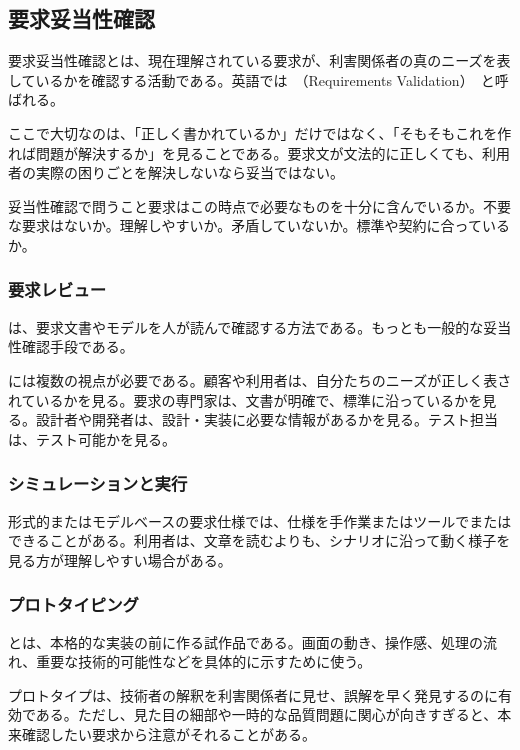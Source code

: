 \documentclass[a4paper,11pt]{ltjsarticle}
\numberwithin{figure}{section}
\numberwithin{table}{section}
\newcommand{\en}[1]{（#1）}
\newcommand{\MiniBox}[2]{\par\smallskip\begin{statementbox}{#1}#2\end{statementbox}\par\smallskip}
\begin{document}
\subsection{要求妥当性確認}

要求妥当性確認とは、現在理解されている要求が、利害関係者の真のニーズを表しているかを確認する活動である。英語では \,\en{Requirements Validation}\, と呼ばれる。

ここで大切なのは、「正しく書かれているか」だけではなく、「そもそもこれを作れば問題が解決するか」を見ることである。要求文が文法的に正しくても、利用者の実際の困りごとを解決しないなら妥当ではない。

\MiniBox{妥当性確認で問うこと}{要求はこの時点で必要なものを十分に含んでいるか。不要な要求はないか。理解しやすいか。矛盾していないか。標準や契約に合っているか。}

\subsubsection{要求レビュー}

は、要求文書やモデルを人が読んで確認する方法である。もっとも一般的な妥当性確認手段である。

には複数の視点が必要である。顧客や利用者は、自分たちのニーズが正しく表されているかを見る。要求の専門家は、文書が明確で、標準に沿っているかを見る。設計者や開発者は、設計・実装に必要な情報があるかを見る。テスト担当は、テスト可能かを見る。

\subsubsection{シミュレーションと実行}

形式的またはモデルベースの要求仕様では、仕様を手作業またはツールでまたはできることがある。利用者は、文章を読むよりも、シナリオに沿って動く様子を見る方が理解しやすい場合がある。

\subsubsection{プロトタイピング}

とは、本格的な実装の前に作る試作品である。画面の動き、操作感、処理の流れ、重要な技術的可能性などを具体的に示すために使う。

プロトタイプは、技術者の解釈を利害関係者に見せ、誤解を早く発見するのに有効である。ただし、見た目の細部や一時的な品質問題に関心が向きすぎると、本来確認したい要求から注意がそれることがある。
\end{document}

